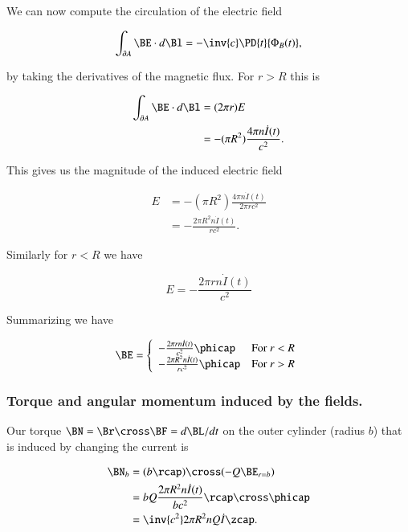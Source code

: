 We can now compute the circulation of the electric field

\begin{equation}\label{eqn:relativisticElectrodynamicsT5:292}
\int_{\partial A} \BE \cdot d\Bl = - \inv{c} \PD{t}{\Phi_B(t)},
\end{equation}

by taking the derivatives of the magnetic flux.  For $r > R$ this is

\begin{align*}
\int_{\partial A} \BE \cdot d\Bl
&= (2 \pi r) E \\
&=
-(\pi R^2) \frac{4 \pi n \dot{I}(t)}{c^2}.
\end{align*}

This gives us the magnitude of the induced electric field

\begin{align*}
E
&= -(\pi R^2) \frac{4 \pi n \dot{I}(t)}{2 \pi r c^2} \\
&= -\frac{2 \pi R^2 n \dot{I}(t)}{r c^2}.
\end{align*}

Similarly for $r < R$ we have

\begin{equation}\label{eqn:relativisticElectrodynamicsT5:293}
E = -\frac{2 \pi r n \dot{I}(t)}{c^2}
\end{equation}

Summarizing we have

\begin{equation}\label{eqn:relativisticElectrodynamicsT5:310}
\BE =
\left\{
\begin{array}{l l}
-\frac{2 \pi r n \dot{I}(t)}{c^2} \phicap 		& \mbox{For $r < R$} \\
-\frac{2 \pi R^2 n \dot{I}(t)}{r c^2} \phicap 		& \mbox{For $r > R$}
\end{array}
\right.
\end{equation}

\subsubsection{Torque and angular momentum induced by the fields.}

Our torque $\BN = \Br \cross \BF = d\BL/dt$ on the outer cylinder (radius $b$) that is induced by changing the current is

\begin{align*}
\BN_b
&= (b \rcap) \cross (-Q \BE_{r = b}) \\
&= b Q \frac{2 \pi R^2 n \dot{I}(t)}{b c^2} \rcap \cross \phicap \\
&= \inv{c^2} 2 \pi R^2 n Q \dot{I} \zcap.
\end{align*}

